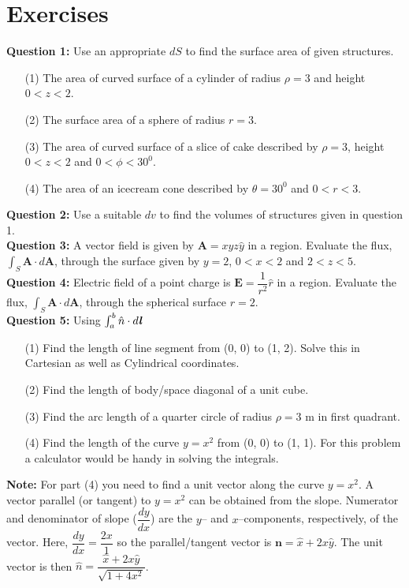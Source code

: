 \documentclass[12pt,a4paper]{article}
\begin{document}
\section{Exercises}
\noindent\textbf{Question 1:} Use an appropriate $dS$ to find the surface area of given structures.
\begin{itemize}
\item[(1)] The area of curved surface of a cylinder of radius $\rho=3$ and height $0<z<2$.
\item[(2)] The surface area of a sphere of radius $r=3$.
\item[(3)] The area of curved surface of a slice of cake described by $\rho=3$, height $0<z<2$ and $0<\phi<30^0$.
\item[(4)] The area of an icecream cone described by $\theta=30^0$ and $0<r<3$.
\end{itemize}
\noindent\textbf{Question 2:} Use a suitable $dv$ to find the volumes of structures given in question 1.\\[0.2cm]
\noindent\textbf{Question 3:} A vector field is given by $\textbf{A}=xyz\hat y$ in a region. Evaluate the flux, $\int_{S}\textbf{A}\cdot d\textbf{A}$, through the surface given by $y=2$, $0<x<2$ and $2<z<5$.\\[0.2cm]
\noindent\textbf{Question 4:} Electric field of a point charge is $\textbf{E}=\dfrac{1}{r^2}\hat r$ in a region. Evaluate the flux, $\int_{S}\textbf{A}\cdot d\textbf{A}$, through the spherical surface $r=2$.\\[0.2cm]
\noindent\textbf{Question 5:} Using $\int_{a}^{b}\hat n\cdot d\textbf{\textit{l}}$
\begin{itemize}
\item[(1)] Find the length of line segment from (0, 0) to (1, 2). Solve this in Cartesian as well as Cylindrical coordinates.
\item[(2)] Find the length of body/space diagonal of a unit cube.
\item[(3)] Find the arc length of a quarter circle of radius $\rho=3$ m in first quadrant.
\item[(4)] Find the length of the curve $y=x^2$ from (0, 0) to (1, 1). For this problem a calculator would be handy in solving the integrals.
\end{itemize}
\noindent\textbf{Note:} For part (4) you need to find a unit vector along the curve $y=x^2$. A vector parallel (or tangent) to $y=x^2$ can be obtained from the slope. Numerator and denominator of slope ($\dfrac{dy}{dx}$) are the $y$-- and $x$--components, respectively, of the vector. Here, $\dfrac{dy}{dx}=\dfrac{2x}{1}$ so the parallel/tangent vector is $\textbf{n}=\hat x+2x\hat y$. The unit vector is then $\hat n=\dfrac{\hat x+2x\hat y}{\sqrt{1+4x^2}}$.\\[0.2cm]
\end{document}
